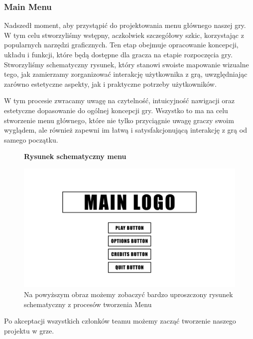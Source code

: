 \subsubsection{Main Menu}
Nadszedł moment, aby przystąpić do projektowania menu głównego naszej gry. W tym celu stworzyliśmy wstępny, aczkolwiek szczegółowy szkic, korzystając z popularnych narzędzi graficznych. Ten etap obejmuje opracowanie koncepcji, układu i funkcji, które będą dostępne dla gracza na etapie rozpoczęcia gry. Stworzyliśmy schematyczny rysunek, który stanowi swoiste mapowanie wizualne tego, jak zamierzamy zorganizować interakcję użytkownika z grą, uwzględniając zarówno estetyczne aspekty, jak i praktyczne potrzeby użytkowników.

W tym procesie zwracamy uwagę na czytelność, intuicyjność nawigacji oraz estetyczne dopasowanie do ogólnej koncepcji gry. Wszystko to ma na celu stworzenie menu głównego, które nie tylko przyciągnie uwagę graczy swoim wyglądem, ale również zapewni im łatwą i satysfakcjonującą interakcję z grą od samego początku.

\begin{figure}[h]
\begin{center}
{\bfseries Rysunek schematyczny menu}
\end{center}
    \centering
    \includegraphics[scale=0.2]{Images/templateMenu.jpg}
    \caption{Na powyższym obraz możemy zobaczyć bardzo uproszczony rysunek schematyczny z procesów tworzenia Menu}
\end{figure}
\FloatBarrier

Po akceptacji wszystkich członków teamu możemy zacząć tworzenie naszego projektu w grze.

